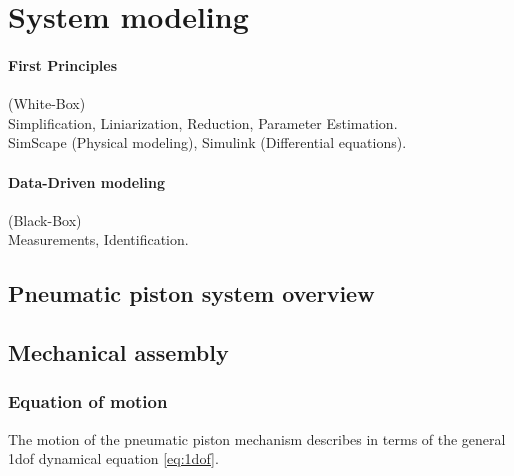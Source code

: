 \documentclass[class=article, crop=false]{standalone}
\begin{document}
\tableofcontents
\pagebreak

\section{System modeling}

\paragraph{First Principles} (White-Box) \\
Simplification, Liniarization, Reduction, Parameter Estimation. \\
SimScape (Physical modeling), Simulink (Differential equations).

\paragraph{Data-Driven modeling}(Black-Box) \\ %
Measurements, Identification.


\subsection{Pneumatic piston system overview}


% 

\subsection{Mechanical assembly}
\subsubsection{Equation of motion}

The motion of the pneumatic piston mechanism describes in terms of the
general 1dof dynamical equation \ref{eq:1dof}. 
\end{document}
